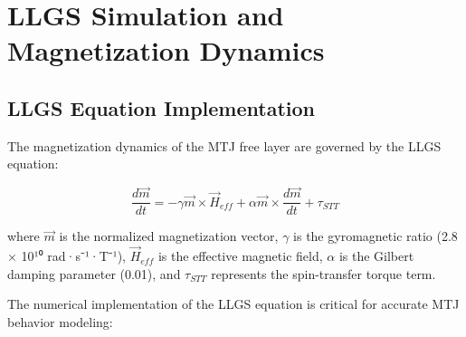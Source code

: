 \documentclass[conference]{IEEEtran}
\begin{document}
\section{LLGS Simulation and Magnetization Dynamics}

\subsection{LLGS Equation Implementation}

The magnetization dynamics of the MTJ free layer are governed by the LLGS equation:

\begin{equation}
\frac{d\vec{m}}{dt} = -\gamma \vec{m} \times \vec{H}_{eff} + \alpha \vec{m} \times \frac{d\vec{m}}{dt} + \tau_{STT}
\label{eq:llgs}
\end{equation}

where $\vec{m}$ is the normalized magnetization vector, $\gamma$ is the gyromagnetic ratio (2.8 × 10¹⁰ rad·s⁻¹·T⁻¹), $\vec{H}_{eff}$ is the effective magnetic field, $\alpha$ is the Gilbert damping parameter (0.01), and $\tau_{STT}$ represents the spin-transfer torque term.

The numerical implementation of the LLGS equation is critical for accurate MTJ behavior modeling:
\end{document}
